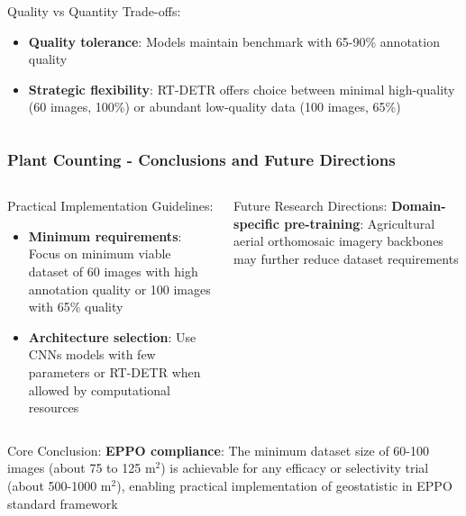 \documentclass[aspectratio=43]{beamer}
\begin{document}
\begin{frame}
\begin{columns}
        \begin{column}{0.5\textwidth}
            \begin{block}{Quality vs Quantity Trade-offs:}
                \scriptsize
                \begin{itemize}
                    \item \textbf{Quality tolerance}: Models maintain benchmark with 65-90\% annotation quality
                    \item \textbf{Strategic flexibility}: RT-DETR offers choice between minimal high-quality (60 images, 100\%) or abundant low-quality data (100 images, 65\%)
                \end{itemize}
            \end{block}
        \end{column}
    \end{columns}
    \end{frame}

\begin{frame}
    \frametitle{\small Plant Counting - Conclusions and Future Directions}
    \begin{columns}
        \begin{column}{0.5\textwidth}
            \begin{exampleblock}{Practical Implementation Guidelines:}
                \scriptsize
                \begin{itemize}
                    \item \textbf{Minimum requirements}: Focus on minimum viable dataset of 60 images with high annotation quality or 100 images with 65\% quality
                    \item \textbf{Architecture selection}: Use CNNs models with few parameters or RT-DETR when allowed by computational resources 
                \end{itemize}
            \end{exampleblock}
        \end{column}
        \begin{column}{0.5\textwidth}
            \begin{block}{Future Research Directions:}
                \scriptsize
                \textbf{Domain-specific pre-training}: Agricultural aerial orthomosaic imagery backbones may further reduce dataset requirements
            \end{block}
        \end{column}
    \end{columns}
    
    \begin{alertblock}{Core Conclusion:}
        \scriptsize
        \textbf{EPPO compliance}: The minimum dataset size of 60-100 images (about 75 to 125 m$^2$) is achievable for any efficacy or selectivity trial (about 500-1000 m$^2$), enabling practical implementation of geostatistic in EPPO standard framework
    \end{alertblock}
\end{frame}
\end{document}
